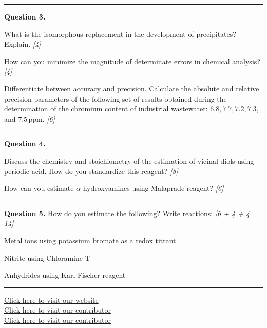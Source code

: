 \documentclass[11pt,a4paper]{article}
\newcommand{\pts}[1]{\hfill   \textit{[#1]}}
\begin{document}
\medskip\rule{\linewidth}{0.2pt}




\noindent   \textbf{Question 3.}

\begin{parts}
  \item What is the isomorphous replacement in the development of precipitates? Explain. \pts{4}
  \item How can you minimize the magnitude of determinate errors in chemical analysis? \pts{4}
  \item Differentiate between accuracy and precision. Calculate the absolute and relative precision parameters of the following set of results obtained during the determination of the chromium content of industrial wastewater: $6.8, 7.7, 7.2, 7.3$, and $7.5\, \text{ppm}$. \pts{6}
\end{parts}

\medskip\rule{\linewidth}{0.2pt}




\noindent   \textbf{Question 4.}

\begin{parts}
  \item Discuss the chemistry and stoichiometry of the estimation of vicinal diols using periodic acid. How do you standardize this reagent? \pts{8}
  \item How can you estimate $\alpha$-hydroxyamines using Malaprade reagent? \pts{6}
\end{parts}

\medskip\rule{\linewidth}{0.2pt}




\noindent   \textbf{Question 5.} How do you estimate the following? Write reactions: \pts{6 + 4 + 4 = 14}

\begin{parts}
  \item Metal ions using potassium bromate as a redox titrant
  \item Nitrite using Chloramine-T
  \item Anhydrides using Karl Fischer reagent
\end{parts}

\vfill
\rule{\linewidth}{0.4pt}

\begin{center}\small
  \href{https://bhu-exam.vercel.app/}{Click here to visit our website}\\[4pt]
  \href{https://me-aryan.vercel.app/}{Click here to visit our contributor}\\[4pt]
  \href{https://quashan-me.vercel.app/}{Click here to visit our contributor}
\end{center}
\end{document}
